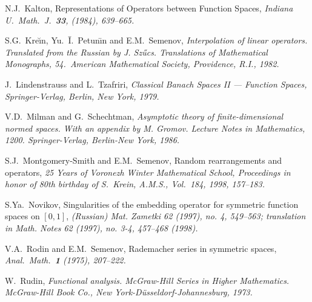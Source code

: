 \documentclass[numreferences]{kluwer}
\begin{document}
\begin{article}
\begin{thebibliography}{99}
 N.J.~Kalton, Representations of Operators between Function Spaces,
{\em Indiana U.\ Math.\ J.\ {\bf 33}, (1984), 639--665.}

S.G.~Kre\u \i n, Yu.~\=I.~Petun\=\i n and E.M.~Semenov, {\em Interpolation of 
linear operators. Translated from the Russian by J. Sz\H ucs. 
Translations of Mathematical Monographs, 54.\ American Mathematical Society, 
Providence, R.I., 1982.}

J.~Lindenstrauss and L.~Tzafriri, {\em Classical Banach Spaces II ---
Function Spaces, Springer-Verlag, Berlin, New York, 1979.}

V.D.~Milman and G.~Schechtman, 
{\em Asymptotic theory of finite-dimensional normed spaces. 
With an appendix by M. Gromov. 
Lecture Notes in Mathematics, 1200. 
Springer-Verlag, Berlin-New York, 1986.}

 S.J.~Montgomery-Smith and E.M.~Semenov, 
Random rearrangements and operators, {\em
25 Years of Voronezh Winter Mathematical School, Proceedings in
honor of 80th birthday of S.~Krein, A.M.S., Vol.\ 184, 1998, 
157--183.}

S.Ya.~Novikov, Singularities of the embedding operator for symmetric 
function spaces on $[0,1]$, {\em (Russian) Mat. Zametki 62 (1997), no. 4,
549--563; translation in Math. Notes 62 (1997), no. 3-4, 457--468 (1998).}

 V.A.~Rodin and E.M.~Semenov, 
Rademacher series in symmetric spaces,
{\em Anal.\ Math.\ {\bf 1} (1975), 207--222.}

W.~Rudin, {\em Functional analysis. McGraw-Hill Series in Higher Mathematics. 
McGraw-Hill Book Co., New
York-D\"usseldorf-Johannesburg, 1973.}

\end{thebibliography}

\end{article}
\end{document}
